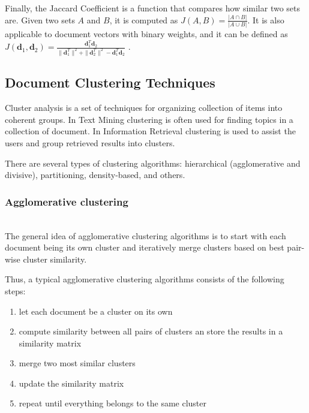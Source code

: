 Finally, the Jaccard Coefficient is a function that compares how similar 
two sets are. Given two sets $A$ and $B$, it is computed as 
$J(A, B) = \frac{|A \cap B|}{|A \cup B|}$.
It is also applicable to document vectors with binary weights, and it can 
be defined as $J(\mathbf d_1, \mathbf d_2) = 
\frac{\mathbf d_1^T \mathbf d_2}{\| \mathbf d_1^T \|^2 + \| \mathbf d_2^T \|^2 - \mathbf d_1^T \mathbf d_2}$ \cite{manning2008introduction}.



\subsection{Document Clustering Techniques} \label{sec:doc-clustering}

Cluster analysis is a set of techniques for organizing collection 
of items into coherent groups. In Text Mining clustering is often 
used for finding topics in a collection of document.
In Information Retrieval clustering is used to assist the users and group
retrieved results into clusters.

There are several types of clustering algorithms:
hierarchical (agglomerative and divisive), partitioning, 
density-based, and others.


\subsubsection{Agglomerative clustering} \label{sec:clustering-heierarchical} \ \\

The general idea of agglomerative clustering algorithms is to start with
each document being its own cluster and iteratively merge clusters based
on best pair-wise cluster similarity.

Thus, a typical agglomerative clustering algorithms consists of the following steps:

\begin{enumerate}
\itemsep1pt\parskip0pt
  \item let each document be a cluster on its own
  \item compute similarity between all pairs of clusters an store the
      results in a similarity matrix
  \item merge two most similar clusters
  \item update the similarity matrix
  \item repeat until everything belongs to the same cluster
\end{enumerate}


